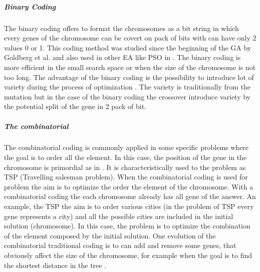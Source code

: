 \subparagraph*{Binary Coding}%
The binary coding offers to format the chromosomes as a bit string in which every genes of the chromosome can be covert on pack of bits with can have only 2 values 0 or 1. This coding method was studied since the beginning of the GA by Goldberg et al.  \cite{97*goldberg1985} and also used in other EA like PSO in \cite{87*morsly2012}. The binary coding is more efficient in the small search space or when the size of the chromosome is not too long. The advantage of the binary coding is the possibility to introduce lot of variety during the process of optimization \cite{73*wright1991}. The variety is traditionally from the mutation but in the case of the binary coding the crossover introduce variety by the potential split of the gene in 2 pack of bit.
\\
\subparagraph*{The combinatorial  }%
The combinatorial  coding is commonly applied in some specific problems where the goal is to order all the element. In this case, the position of the gene in the chromosome is primordial as in \cite{ 110*eiben2003}. It is characteristically used to the problem as TSP \cite{80*serpell2010} (Travelling salesman problem).  When the combinatorial  coding is used for problem the aim is to optimize the order the element of the chromosome. With a combinatorial  coding the each chromosome already has all gene of the answer. An example, the TSP the aim is to order various cities (in the problem of TSP every gene represents a city) and all the possible cities are included in the initial solution (chromosome). In this case, the problem is to optimize the combination of the element composed by the initial solution. 
One evolution of the combinatorial traditional coding is to can add and remove some genes, that obviously affect the size of the chromosome, for example  when the goal is to find the shortest distance in the tree \cite{113*mais2010}. \\

